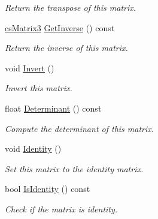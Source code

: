 \begin{DoxyCompactItemize}
\begin{DoxyCompactList}\small\item\em Return the transpose of this matrix. \end{DoxyCompactList}\item 
\hyperlink{classcsMatrix3}{cs\+Matrix3} \hyperlink{classcsMatrix3_ac030fcde1006e30203943b62279478c7}{Get\+Inverse} () const \hypertarget{classcsMatrix3_ac030fcde1006e30203943b62279478c7}{}\label{classcsMatrix3_ac030fcde1006e30203943b62279478c7}

\begin{DoxyCompactList}\small\item\em Return the inverse of this matrix. \end{DoxyCompactList}\item 
void \hyperlink{classcsMatrix3_a55fde128b92e1655519ace4cde07648d}{Invert} ()\hypertarget{classcsMatrix3_a55fde128b92e1655519ace4cde07648d}{}\label{classcsMatrix3_a55fde128b92e1655519ace4cde07648d}

\begin{DoxyCompactList}\small\item\em Invert this matrix. \end{DoxyCompactList}\item 
float \hyperlink{classcsMatrix3_a6fff68877b42606c830e30b924c4d211}{Determinant} () const \hypertarget{classcsMatrix3_a6fff68877b42606c830e30b924c4d211}{}\label{classcsMatrix3_a6fff68877b42606c830e30b924c4d211}

\begin{DoxyCompactList}\small\item\em Compute the determinant of this matrix. \end{DoxyCompactList}\item 
void \hyperlink{classcsMatrix3_a0acfb319aa4feb890e5f1ca1d078d93c}{Identity} ()\hypertarget{classcsMatrix3_a0acfb319aa4feb890e5f1ca1d078d93c}{}\label{classcsMatrix3_a0acfb319aa4feb890e5f1ca1d078d93c}

\begin{DoxyCompactList}\small\item\em Set this matrix to the identity matrix. \end{DoxyCompactList}\item 
bool \hyperlink{classcsMatrix3_a82cdde0965f44eadfc8be4df7d8b5eee}{Is\+Identity} () const \hypertarget{classcsMatrix3_a82cdde0965f44eadfc8be4df7d8b5eee}{}\label{classcsMatrix3_a82cdde0965f44eadfc8be4df7d8b5eee}

\begin{DoxyCompactList}\small\item\em Check if the matrix is identity. \end{DoxyCompactList}\end{DoxyCompactItemize}
